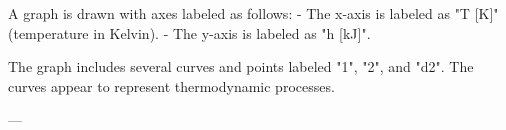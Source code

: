 A graph is drawn with axes labeled as follows:  
- The x-axis is labeled as "T [K]" (temperature in Kelvin).  
- The y-axis is labeled as "h [kJ]".  

The graph includes several curves and points labeled "1", "2", and "d2". The curves appear to represent thermodynamic processes.  

---